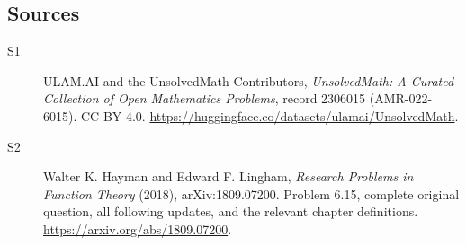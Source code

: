 \documentclass[11pt]{book}
\begin{document}
\subsection{Sources}
\begin{description}
\item[\hypertarget{source:2306015:1}{S1}] ULAM.AI and the UnsolvedMath Contributors, \emph{UnsolvedMath: A Curated Collection of Open Mathematics Problems}, record 2306015 (AMR-022-6015). CC BY 4.0. \url{https://huggingface.co/datasets/ulamai/UnsolvedMath}.
\item[\hypertarget{source:2306015:2}{S2}] Walter K. Hayman and Edward F. Lingham, \emph{Research Problems in Function Theory} (2018), arXiv:1809.07200. Problem 6.15, complete original question, all following updates, and the relevant chapter definitions. \url{https://arxiv.org/abs/1809.07200}.
\end{description}
\label{end:2306015}
\end{document}
